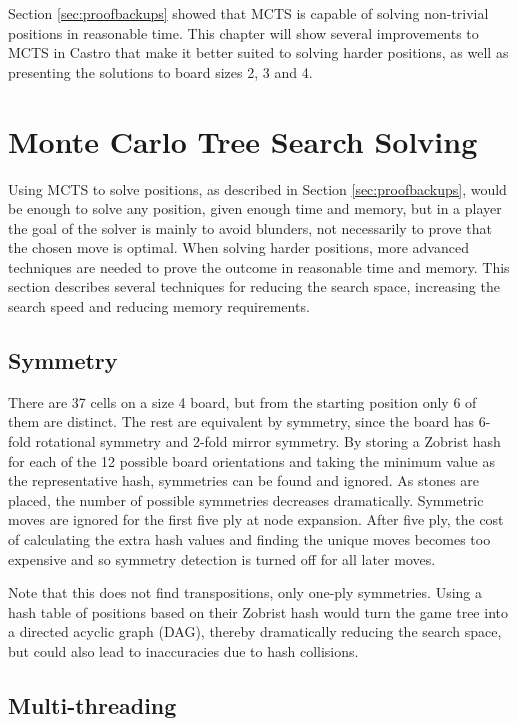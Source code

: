 


Section \ref{sec:proofbackups} showed that MCTS is capable of solving non-trivial positions in reasonable time. This chapter will show several improvements to MCTS in Castro that make it better suited to solving harder positions, as well as presenting the solutions to board sizes 2, 3 and 4.


\section{Monte Carlo Tree Search Solving}

Using MCTS to solve positions, as described in Section \ref{sec:proofbackups}, would be enough to solve any position, given enough time and memory, but in a player the goal of the solver is mainly to avoid blunders, not necessarily to prove that the chosen move is optimal. When solving harder positions, more advanced techniques are needed to prove the outcome in reasonable time and memory. This section describes several techniques for reducing the search space, increasing the search speed and reducing memory requirements.


\subsection{Symmetry}

There are 37 cells on a size 4 board, but from the starting position only 6 of them are distinct. The rest are equivalent by symmetry, since the board has 6-fold rotational symmetry and 2-fold mirror symmetry. By storing a Zobrist hash \cite{zobrist1990new} for each of the 12 possible board orientations and taking the minimum value as the representative hash, symmetries can be found and ignored. As stones are placed, the number of possible symmetries decreases dramatically. Symmetric moves are ignored for the first five ply at node expansion. After five ply, the cost of calculating the extra hash values and finding the unique moves becomes too expensive and so symmetry detection is turned off for all later moves.

Note that this does not find transpositions, only one-ply symmetries. Using a hash table of positions based on their Zobrist hash would turn the game tree into a directed acyclic graph (DAG), thereby dramatically reducing the search space, but could also lead to inaccuracies due to hash collisions.

\subsection{Multi-threading}

